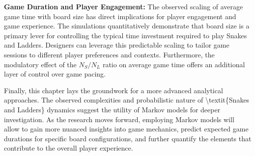 \textbf{Game Duration and Player Engagement:}  The observed scaling of average game time with board size has direct implications for player engagement and game experience.  The simulations quantitatively demonstrate that board size is a primary lever for controlling the typical time investment required to play Snakes and Ladders. Designers can leverage this predictable scaling to tailor game sessions to different player preferences and contexts. Furthermore, the modulatory effect of the $N_S/N_L$ ratio on average game time offers an additional layer of control over game pacing.

Finally, this chapter lays the groundwork for a more advanced analytical approaches. The observed complexities and probabilistic nature of \textbackslash{}textit\{Snakes and Ladders\} dynamics suggest the utility of Markov models for deeper investigation. As the research moves forward, employing Markov models will allow to gain more nuanced insights into game mechanics, predict expected game durations for specific board configurations, and further quantify the elements that contribute to the overall player experience.



